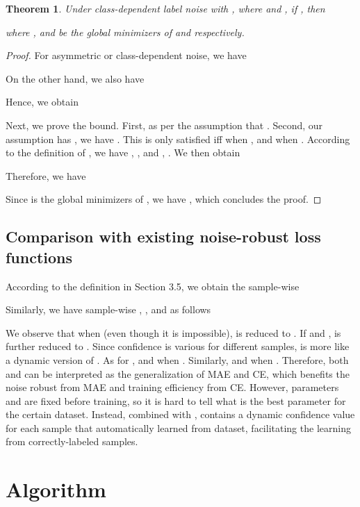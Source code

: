 \documentclass{article}
\newtheorem{theorem}{Theorem}
\begin{document}
\begin{theorem}
	Under class-dependent label noise with , where  and , if , then
	
	where ,  and  be the global minimizers of  and  respectively. 
	
\end{theorem}
\begin{proof}
	For asymmetric or class-dependent noise, we have 
	
	On the other hand, we also have 
	
	Hence, we obtain 
	
	Next, we prove the bound. First,  as per the assumption that . Second, our assumption has , we have . This is only satisfied iff  when , and  when . According to the definition of , we have , , and , . We then obtain
	
	Therefore, we have
		
	Since  is the global minimizers of , we have , which concludes the proof.
\end{proof}


\subsection{Comparison with existing noise-robust loss functions}
\label{sec:sample_wise_loss}
According to the definition in Section 3.5, we obtain the sample-wise

Similarly, we have sample-wise  \cite{ghosh2017robust},  \cite{wang2019symmetric},  \cite{zhang2018generalized} and  \cite{feng2020can} as follows








We observe that when  (even though it is impossible),  is reduced to . If  and ,  is further reduced to . Since confidence  is various for different samples,  is more like a dynamic version of . As for ,  and  when . Similarly,  and  when . Therefore, both  and  can be interpreted as the generalization of MAE and CE, which benefits the noise robust from MAE and training efficiency from CE. However, parameters  and  are fixed before training, so it is hard to tell what is the best parameter for the certain dataset. Instead, combined with ,  contains a dynamic confidence value  for each sample that automatically learned from dataset, facilitating the learning from correctly-labeled samples.


\section{Algorithm}
\end{document}
